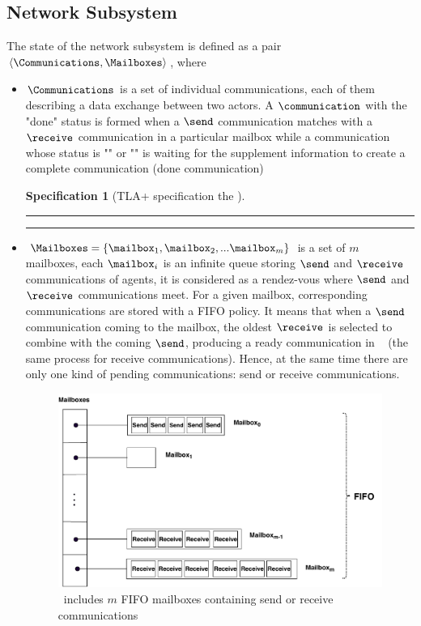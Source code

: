 \documentclass[a4paper,11pt]{article}
\theoremstyle{break}
\newtheorem{TLA}{Specification}
\begin{document}
\subsection{Network Subsystem}
The state of the network subsystem is defined as a pair $\langle \Communications, \Mailboxes \rangle$, where \begin{itemize}[noitemsep]
	
	
\setlength{\itemsep}{3pt}

\item $\Communications$ is a set of individual communications, each of them describing a data exchange  between two actors.  A $\communication$ with the "done" status is formed when a $\send$ communication matches with a $\receive$ communication in a particular mailbox while a communication whose status is "\send" or "\receive" is waiting for the supplement information to create a complete communication (done communication)


\begin{TLA}[TLA+ specification the \Communications]
	\par\noindent\rule{\textwidth}{0.4pt}
	\begin{tlatex}
		
	\end{tlatex}
	\par\noindent\rule{\textwidth}{0.4pt}
\end{TLA}

\item $\Mailboxes = \{ \mailbox_1, \mailbox_2, ... \mailbox_m \}$ is a set of $m$ mailboxes, each $\mailbox_i$ is an infinite queue storing $\send$ and $\receive$ communications of agents, it is considered as a rendez-vous
where $\send$ and $\receive$ communications meet. For a given mailbox, corresponding communications are stored with a FIFO policy. It means that when a $\send$ communication coming to the mailbox, the oldest $\receive$ is selected to combine with the coming $\send$, producing a ready communication in \Communications~ (the same process for receive communications). Hence, at the same time there are only one kind of pending communications: send or receive communications. 
\begin{figure}[H]
\centerline{\includegraphics[scale=.55]{Figures/Mailboxes.pdf}}
\caption{\Mailboxes~includes $m$ FIFO mailboxes containing send or receive communications}
\end{figure}



\end{itemize}
\end{document}
